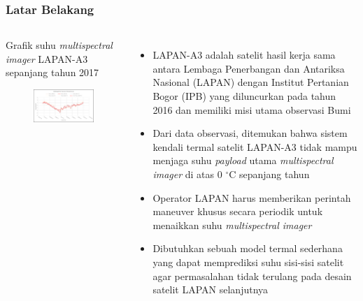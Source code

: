 \documentclass[8pt]{beamer}
\begin{document}
\begin{frame}
  \frametitle{Latar Belakang}
  \begin{columns}[T]
            \begin{block}{\center Grafik suhu \textit{multispectral imager} LAPAN-A3 sepanjang tahun 2017}
      \begin{figure}
          \includegraphics[width=1.0\textwidth]{figure/multispectralimager.png}
      \end{figure}
            \end{block}
    \begin{itemize}
        \item LAPAN-A3 adalah satelit hasil kerja sama antara Lembaga Penerbangan dan Antariksa Nasional (LAPAN) dengan Institut Pertanian Bogor (IPB) yang diluncurkan pada tahun 2016 dan memiliki misi utama observasi Bumi \cite{hasbi2013}
      \item Dari data observasi, ditemukan bahwa sistem kendali termal satelit LAPAN-A3 tidak mampu menjaga suhu \textit{payload} utama \textit{multispectral imager} di atas 0 $^\circ$C sepanjang tahun \cite{ribah2019}
      \item Operator LAPAN harus memberikan perintah maneuver khusus secara periodik untuk menaikkan suhu \textit{multispectral imager}
      \item Dibutuhkan sebuah model termal sederhana yang dapat memprediksi suhu sisi-sisi satelit agar permasalahan tidak terulang pada desain satelit LAPAN selanjutnya
    \end{itemize}
  \end{columns}
\end{frame}
\end{document}
